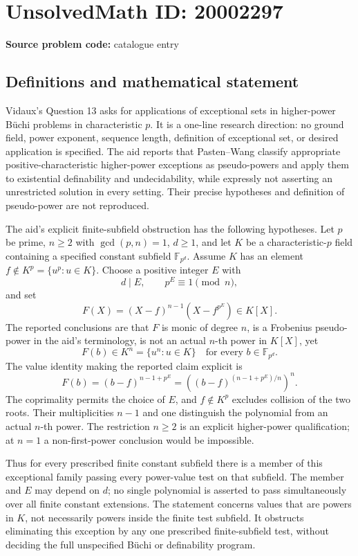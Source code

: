 \documentclass[11pt]{article}
\newcommand{\F}{\mathbb{F}}
\begin{document}
\section*{UnsolvedMath ID: 20002297}
\textbf{Source problem code:} catalogue entry
\subsection{Definitions and mathematical statement}
Vidaux's Question 13 asks for applications of exceptional sets in higher-power Büchi problems in characteristic \(p\). It is a one-line research direction: no ground field, power exponent, sequence length, definition of exceptional set, or desired application is specified. The aid reports that Pasten--Wang classify appropriate positive-characteristic higher-power exceptions as pseudo-powers and apply them to existential definability and undecidability, while expressly not asserting an unrestricted solution in every setting. Their precise hypotheses and definition of pseudo-power are not reproduced.

The aid's explicit finite-subfield obstruction has the following hypotheses. Let \(p\) be prime, \(n\ge2\) with \(\gcd(p,n)=1\), \(d\ge1\), and let \(K\) be a characteristic-\(p\) field containing a specified constant subfield \(\F_{p^d}\). Assume \(K\) has an element \(f\notin K^p=\{u^p:u\in K\}\). Choose a positive integer \(E\) with
\[
 d\mid E,\qquad p^E\equiv1\pmod n,
\]
and set
\[
 F(X)=(X-f)^{n-1}(X-f^{p^E})\in K[X].
\]
The reported conclusions are that \(F\) is monic of degree \(n\), is a Frobenius pseudo-power in the aid's terminology, is not an actual \(n\)-th power in \(K[X]\), yet
\[
 F(b)\in K^n=\{u^n:u\in K\}
 \quad\text{for every }b\in\F_{p^d}.
\]
The value identity making the reported claim explicit is
\[
 F(b)=(b-f)^{n-1+p^E}
 =\left((b-f)^{(n-1+p^E)/n}\right)^n.
\]
The coprimality permits the choice of \(E\), and \(f\notin K^p\) excludes collision of the two roots. Their multiplicities \(n-1\) and one distinguish the polynomial from an actual \(n\)-th power. The restriction \(n\ge2\) is an explicit higher-power qualification; at \(n=1\) a non-first-power conclusion would be impossible.

Thus for every prescribed finite constant subfield there is a member of this exceptional family passing every power-value test on that subfield. The member and \(E\) may depend on \(d\); no single polynomial is asserted to pass simultaneously over all finite constant extensions. The statement concerns values that are powers in \(K\), not necessarily powers inside the finite test subfield. It obstructs eliminating this exception by any one prescribed finite-subfield test, without deciding the full unspecified Büchi or definability program.
\end{document}
